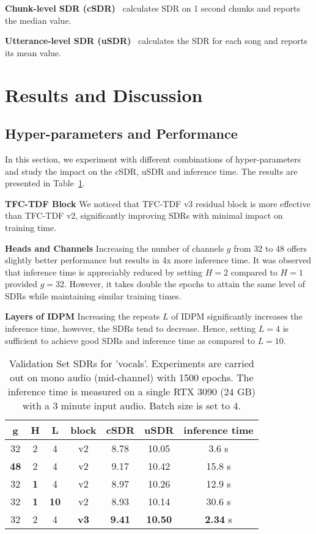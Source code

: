 \noindent \textbf{Chunk-level SDR (cSDR)}~\cite{SiSEC18} calculates SDR on 1 second chunks and reports the median value.


\noindent \textbf{Utterance-level SDR (uSDR)}~\cite{mitsufuji_music_2022} calculates the SDR for each song and reports its mean value.



\section{Results and Discussion}
\subsection{Hyper-parameters and Performance}
In this section, we experiment with different combinations of hyper-parameters and study the impact on the cSDR, uSDR and inference time. The results are presented in Table~\ref{tbl:hyer}.

\noindent \textbf{TFC-TDF Block} We noticed that TFC-TDF v3 residual block is more effective than TFC-TDF v2, significantly improving SDRs with minimal impact on training time.

\noindent \textbf{Heads and Channels} Increasing the number of channels $g$ from 32 to 48 offers slightly better performance but results in 4x more inference time. It was observed that inference time is appreciably reduced by setting $H=2$ compared to $H=1$ provided $g=32$. However, it takes double the epochs to attain the same level of SDRs while maintaining similar training times.

\noindent \textbf{Layers of IDPM} Increasing the repeats $L$ of IDPM significantly increases the inference time, however, the SDRs tend to decrease. Hence, setting $L = 4$ is sufficient to achieve good SDRs and inference time as compared to $L = 10$.


\begin{table}[h]
    \centering
    \caption{Validation Set SDRs for 'vocals'. Experiments are carried out on mono audio (mid-channel) with 1500 epochs. The inference time is measured on a single RTX 3090 (24 GB) with a 3 minute input audio. Batch size is set to 4.}\label{tbl:hyer}
    \begin{tabular}{cccc|ccc}\hline
        g& H &  L& block&cSDR &uSDR & inference time\\\hline
        32 &2 &  4& v2& 8.78 & 10.05 & 3.6 s\\
\textbf{48}& 2 & 4& v2 & 9.17 & 10.42 & 15.8 s\\
        32 &\textbf{1} & 4& v2& 8.97 & 10.26 & 12.9 s\\
        32 & \textbf{1} &  \textbf{10}& v2 & 8.93 & 10.14 & 30.6 s\\
        32 &2 &  4& \textbf{v3}&\textbf{9.41}&\textbf{10.50}& \textbf{2.34} s
        \\\hline
    \end{tabular}
	
\end{table}





